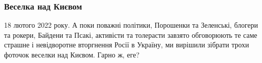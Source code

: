  
 
 
 
 
\clearpage
\subsubsection{Веселка над Києвом}

18 лютого 2022 року. А поки поважні політики, Порошенки та Зеленські, блогери
та рокери, Байдени та Псакі, активісти та толерасти завзято обговорюють те саме
страшне і невідворотне вторгнення Росії в Україну, ми вирішили зібрати трохи
фоточок веселки над Києвом. Гарно ж, еге?

